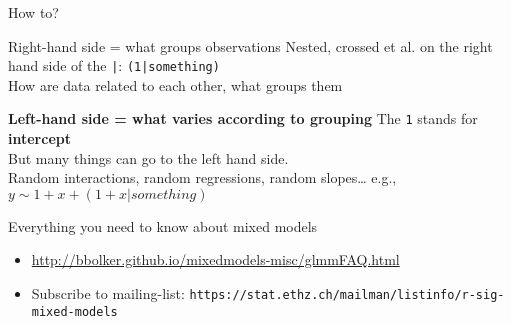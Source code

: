 \documentclass{beamer}
\begin{document}
\begin{frame}{How to?}

\begin{alertblock}{Right-hand side = what groups observations}
Nested, crossed et al. on the right hand side of the \texttt{|}: \texttt{(1|something)}\\
How are data related to each other, what groups them\\
\end{alertblock}


\pause
\begin{alertblock}{\textbf{Left-hand side = what varies according to grouping}}
The \texttt{1} stands for \textbf{intercept}\\
But many things can go to the left hand side. \\
Random interactions, random regressions, random slopes\dots
 e.g., $y \sim 1 + x + (1 + x | something)$
\end{alertblock}
 
\end{frame}



\begin{frame}{Everything you need to know about mixed models}

\begin{itemize}
 \item \url{http://bbolker.github.io/mixedmodels-misc/glmmFAQ.html}
 \item Subscribe to mailing-list: \texttt{https://stat.ethz.ch/mailman/listinfo/r-sig-mixed-models}
\end{itemize}

\end{frame}
\end{document}
